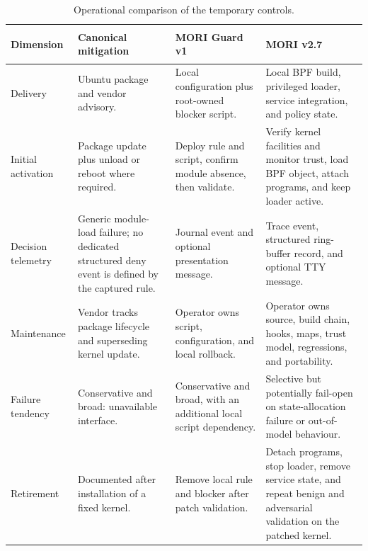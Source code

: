 \begin{table}[H]
    \centering
    \caption{Operational comparison of the temporary controls.}
    \label{tab:vendor-operational-comparison}
    \scriptsize
    \begin{tabularx}{\textwidth}{@{}>{\bfseries\raggedright\arraybackslash}p{}>{\raggedright\arraybackslash}p{}>{\raggedright\arraybackslash}p{}Y@{}}
        \toprule
        Dimension & Canonical  mitigation & MORI Guard v1 & MORI v2.7 \\
        \midrule
        Delivery &
        Ubuntu package and vendor advisory. &
        Local configuration plus root-owned blocker script. &
        Local BPF build, privileged loader, service integration, and policy
        state. \\

        Initial activation &
        Package update plus unload or reboot where required. &
        Deploy rule and script, confirm module absence, then validate. &
        Verify kernel facilities and monitor trust, load BPF object, attach
        programs, and keep loader active. \\

        Decision telemetry &
        Generic module-load failure; no dedicated structured deny event is
        defined by the captured rule. &
        Journal event and optional presentation message. &
        Trace event, structured ring-buffer record, and optional TTY message. \\

        Maintenance &
        Vendor tracks package lifecycle and superseding kernel update. &
        Operator owns script, configuration, and local rollback. &
        Operator owns source, build chain, hooks, maps, trust model, regressions,
        and portability. \\

        Failure tendency &
        Conservative and broad: unavailable interface. &
        Conservative and broad, with an additional local script dependency. &
        Selective but potentially fail-open on state-allocation failure or
        out-of-model behaviour. \\

        Retirement &
        Documented after installation of a fixed kernel. &
        Remove local rule and blocker after patch validation. &
        Detach programs, stop loader, remove service state, and repeat benign
        and adversarial validation on the patched kernel. \\
        \bottomrule
    \end{tabularx}
\end{table}

